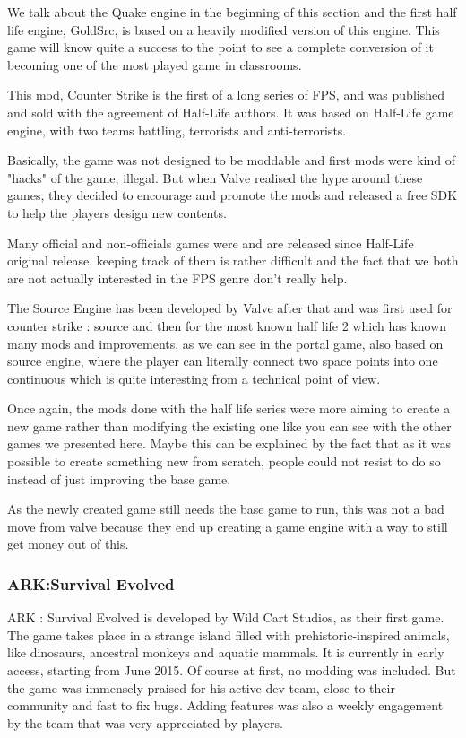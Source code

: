 \documentclass[a4paper,12pt]{article}
\begin{document}
We talk about the Quake engine in the beginning of this section and the first half life engine, GoldSrc, is based on a heavily modified version of this engine. This game will know quite a success to the point to see a complete conversion of it becoming one of the most played game in classrooms.

This mod, Counter Strike is the first of a long series of FPS, and was published and sold with the agreement of Half-Life authors. It was based on Half-Life game engine, with two teams battling, terrorists and anti-terrorists.

Basically, the game was not designed to be moddable and first mods were kind of "hacks" of the game, illegal. But when Valve realised the hype around these games, they decided to encourage and promote the mods and released a free SDK to help the players design new contents.

Many official and non-officials games were and are released since Half-Life original release, keeping track of them is rather difficult and the fact that we both are not actually interested in the FPS genre don't really help.

The Source Engine has been developed by Valve after that and was first used for counter strike : source and then for the most known half life 2 which has known many mods and improvements, as we can see in the portal game, also based on source engine, where the player can literally connect two space points into one continuous which is quite interesting from a technical point of view.

Once again, the mods done with the half life series were more aiming to create a new game rather than modifying the existing one like you can see with the other games we presented here. Maybe this can be explained by the fact that as it was possible to create something new from scratch, people could not resist to do so instead of just improving the base game.

As the newly created game still needs the base game to run, this was not a bad move from valve because they end up creating a game engine with a way to still get money out of this.


\subsubsection{ARK:Survival Evolved}

ARK : Survival Evolved is developed by Wild Cart Studios, as their first game. The game takes place in a strange island filled with prehistoric-inspired animals, like dinosaurs, ancestral monkeys and aquatic mammals. It is currently in early access, starting from June 2015. Of course at first, no modding was included. But the game was immensely praised for his active dev team, close to their community and fast to fix bugs. Adding features was also a weekly engagement by the team that was very appreciated by players.
\end{document}
